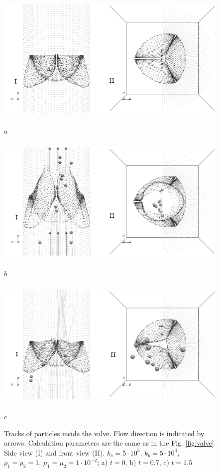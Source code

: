 \documentclass[runningheads,a4paper]{llncs}
\begin{document}
\begin{figure}
\centering
\includegraphics[height=6.2cm]{images/valve_with_particles_1_gray.png}

$a$

\includegraphics[height=6.2cm]{images/valve_with_particles_2_gray.png}

$b$

\includegraphics[height=6.2cm]{images/valve_with_particles_3_gray.png}

$c$

\caption{Tracks of particles inside the valve. Flow direction is indicated by arrows. Calculation parameters are the same as in the Fig. \ref{fig:valve}
Side view (I) and front view (II). $k_s = 5 \cdot 10^3$, $k_b = 5 \cdot 10^3$, $\rho_1 = \rho_2 = 1$,
$\mu_1 = \mu_2 = 1 \cdot 10^{-2}$; a) $t=0$, b) $t=0.7$, c) $t=1.5$}

\label{fig:valve_with_particles}
\end{figure}
\end{document}
